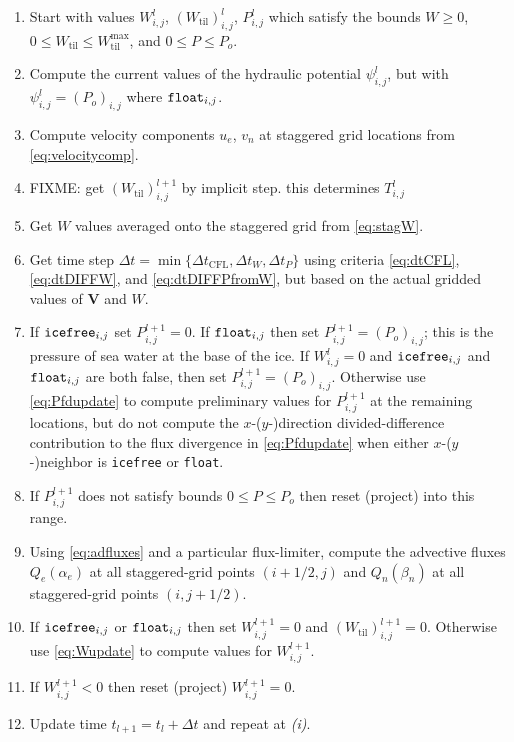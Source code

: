 \documentclass[11pt,final]{amsart}
\newcommand\bV{\mathbf{V}}
\newcommand{\Wtil}{W_{\text{til}}}
\newcommand{\Wtilmax}{W_{\text{til}}^{\text{max}}}
\newcommand{\Wlij}{W^l_{i,j}}
\newcommand{\Plij}{P^l_{i,j}}
\begin{document}
\bigskip\medskip
\renewcommand{\labelenumi}{\emph{(\roman{enumi})}}
\begin{enumerate}
\item Start with values $\Wlij$, $(\Wtil)_{i,j}^l$, $\Plij$ which satisfy the bounds $W\ge 0$, $0\le \Wtil \le \Wtilmax$, and $0 \le P \le P_o$.
\item Compute the current values of the hydraulic potential $\psi_{i,j}^l$, but with $\psi_{i,j}^l=(P_o)_{i,j}$ where $\text{\texttt{float}}_{i,j}$.
\item Compute velocity components $u_e$, $v_n$ at staggered grid locations from \eqref{eq:velocitycomp}.
\item FIXME: get $(\Wtil)_{i,j}^{l+1}$ by implicit step.  this determines $T_{i,j}^l$
\item Get $W$ values averaged onto the staggered grid from \eqref{eq:stagW}.
\item Get time step $\Delta t = \min\{\Delta t_{\text{CFL}}, \Delta t_W, \Delta t_P\}$ using criteria \eqref{eq:dtCFL}, \eqref{eq:dtDIFFW}, and \eqref{eq:dtDIFFPfromW}, but based on the actual gridded values of $\bV$ and $W$.
\item If $\text{\texttt{icefree}}_{i,j}$ set $P_{i,j}^{l+1}=0$.  If $\text{\texttt{float}}_{i,j}$ then set $P_{i,j}^{l+1} = (P_o)_{i,j}$; this is the pressure of sea water at the base of the ice.  If $\Wlij=0$ and $\text{\texttt{icefree}}_{i,j}$ and $\text{\texttt{float}}_{i,j}$ are both false, then set $P_{i,j}^{l+1} = (P_o)_{i,j}$.  Otherwise use \eqref{eq:Pfdupdate} to compute preliminary values for $P_{i,j}^{l+1}$ at the remaining locations, but do not compute the $x$-($y$-)direction divided-difference contribution to the flux divergence in \eqref{eq:Pfdupdate} when either $x$-($y$-)neighbor is \texttt{icefree} or \texttt{float}.
\item If $P_{i,j}^{l+1}$ does not satisfy bounds $0 \le P \le P_o$ then reset (project) into this range.
\item Using \eqref{eq:adfluxes} and a particular flux-limiter, compute the advective fluxes $Q_e(\alpha_e)$ at all staggered-grid points $(i+1/2,j)$ and $Q_n(\beta_n)$ at all staggered-grid points $(i,j+1/2)$.  
\item If $\text{\texttt{icefree}}_{i,j}$ or $\text{\texttt{float}}_{i,j}$ then set $W_{i,j}^{l+1}=0$ and $(\Wtil)_{i,j}^{l+1}=0$.  Otherwise use \eqref{eq:Wupdate} to compute values for $W_{i,j}^{l+1}$.
\item If $W_{i,j}^{l+1}<0$ then reset (project) $W_{i,j}^{l+1}=0$.
\item Update time $t_{l+1}=t_l+\Delta t$ and repeat at \emph{(i)}.
\end{enumerate}
\end{document}
